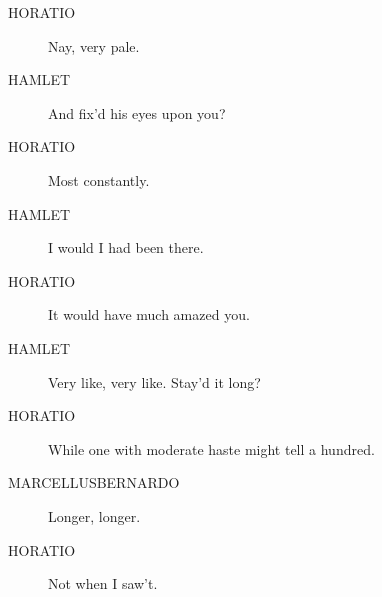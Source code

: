 \documentclass{article}
\begin{document}
\begin{description}
            
\item[HORATIO] Nay, very pale.
\end{description}
          
\begin{description}
            
\item[HAMLET] And fix'd his eyes upon you?
\end{description}
          
\begin{description}
            
\item[HORATIO] Most constantly.
\end{description}
          
\begin{description}
            
\item[HAMLET] I would I had been there.
\end{description}
          
\begin{description}
            
\item[HORATIO] It would have much amazed you.
\end{description}
          
\begin{description}
            
\item[HAMLET] Very like, very like. Stay'd it long?
\end{description}
          
\begin{description}
            
\item[HORATIO] While one with moderate haste might tell a hundred.
\end{description}
          
\begin{description}
            
\item[MARCELLUSBERNARDO] Longer, longer.
\end{description}
          
\begin{description}
            
\item[HORATIO] Not when I saw't.
\end{description}
          
\end{document}
